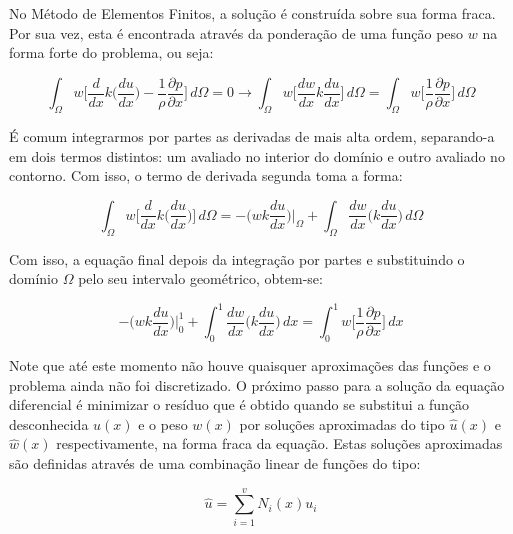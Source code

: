 No Método de Elementos Finitos, a solução é construída sobre sua forma
fraca. Por sua vez, esta é encontrada através da ponderação de uma
função peso $w$ na forma forte do problema, ou seja:

\begin{equation}
	\int_{\Omega}w \bigg[\frac{d}{dx} k \bigg( \frac{du}{dx} \bigg) -
	\frac{1}{\rho} \frac{\partial p}{\partial x}
	\bigg] \, d \Omega
	= 0 \longrightarrow
	\int_{\Omega} w \bigg[ \frac{dw}{dx} k \frac{du}{dx} \bigg] \, d\Omega
	= 
	\int_{\Omega} w \bigg[ \frac{1}{\rho} 
	\frac{\partial p}{\partial x} \bigg] \, d\Omega 
	\label{eq:mef2}
\end{equation}

É comum integrarmos por partes as derivadas de mais alta ordem,
separando-a em dois termos distintos: um avaliado no interior do domínio
e outro avaliado no contorno. Com isso, o termo de derivada segunda toma
a forma:

\begin{equation}
	\int_{\Omega} w \bigg[\frac{d}{dx} k \bigg( \frac{du}{dx} 
	\bigg) \bigg] \, d \Omega
	=
	- \bigg( w k \frac{du}{dx} \bigg) \bigg|_{\Omega} 
	+ 
	\int_{\Omega} \frac{dw}{dx} \bigg( k \frac{du}{dx} \bigg) \, 
    d \Omega
	\label{eq:mef3}
\end{equation}

Com isso, a equação final depois da integração por partes e substituindo
o domínio $\Omega$ pelo seu intervalo geométrico, obtem-se:

\begin{equation}
	- \bigg( w k \frac{du}{dx} \bigg) \bigg|_{0}^{1} 
	+ 
	\int_{0}^{1} \frac{dw}{dx} \bigg( k \frac{du}{dx} \bigg)  \, dx
	=
	\int_{0}^{1} w \bigg[ \frac{1}{\rho} 
	\frac{\partial p}{\partial x} \bigg] \, dx
	\label{eq:mef4}
\end{equation}

Note que até este momento não houve quaisquer aproximações das funções e
o problema ainda não foi discretizado. O próximo passo para a solução da
equação diferencial é minimizar o resíduo que é obtido quando se
substitui a função desconhecida $u(x)$  e o peso $w(x)$ por soluções
aproximadas do tipo $\hat{u}(x)$ e $\hat{w}(x)$ respectivamente, na
forma fraca da equação. Estas soluções aproximadas
são definidas através de uma combinação linear de funções do tipo:

\begin{equation}
	\hat{u} 
	=
	\sum\limits_{i=1}^v N_i(x) u_i 
	\label{eq:mef5}
\end{equation}

